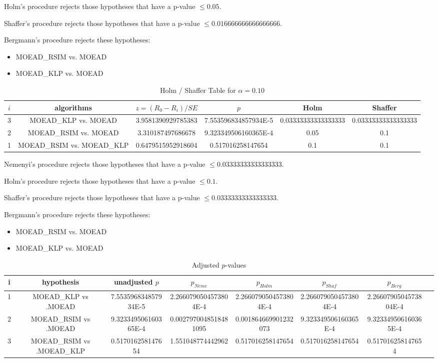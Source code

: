 \documentclass[a4paper,10pt]{article}
\begin{document}
\begin{landscape}
Holm's procedure rejects those hypotheses that have a p-value $\le0.05$.


Shaffer's procedure rejects those hypotheses that have a p-value $\le0.016666666666666666$.


Bergmann's procedure rejects these hypotheses:


\begin{itemize}


\item MOEAD_RSIM vs. MOEAD
\item MOEAD_KLP vs. MOEAD
\end{itemize}


\begin{table}[!htp]
\centering\tiny
\caption{Holm / Shaffer Table for $\alpha=0.10$}
\begin{tabular}{cccccc}
$i$&algorithms&$z=(R_0 - R_i)/SE$&$p$&Holm&Shaffer\\
\hline
3&MOEAD_KLP vs. MOEAD&3.9581390929785383&7.553596834857934E-5&0.03333333333333333&0.03333333333333333\\
2&MOEAD_RSIM vs. MOEAD&3.310187497686678&9.323349506160365E-4&0.05&0.1\\
1&MOEAD_RSIM vs. MOEAD_KLP&0.6479515952918604&0.517016258147654&0.1&0.1\\
\hline
\end{tabular}
\end{table}
Nemenyi's procedure rejects those hypotheses that have a p-value $\le0.03333333333333333$.


Holm's procedure rejects those hypotheses that have a p-value $\le0.1$.


Shaffer's procedure rejects those hypotheses that have a p-value $\le0.03333333333333333$.


Bergmann's procedure rejects these hypotheses:


\begin{itemize}


\item MOEAD_RSIM vs. MOEAD
\item MOEAD_KLP vs. MOEAD
\end{itemize}


\begin{table}[!htp]
\centering\tiny
\caption{Adjusted $p$-values}
\begin{tabular}{cccccccc}
i&hypothesis&unadjusted $p$&$p_{Neme}$&$p_{Holm}$&$p_{Shaf}$&$p_{Berg}$\\
\hline
1&MOEAD_KLP vs .MOEAD&7.553596834857934E-5&2.2660790504573804E-4&2.2660790504573804E-4&2.2660790504573804E-4&2.2660790504573804E-4\\
2&MOEAD_RSIM vs .MOEAD&9.323349506160365E-4&0.0027970048518481095&0.001864669901232073&9.323349506160365E-4&9.323349506160365E-4\\
3&MOEAD_RSIM vs .MOEAD_KLP&0.517016258147654&1.551048774442962&0.517016258147654&0.517016258147654&0.517016258147654\\
\hline
\end{tabular}
\end{table}

\end{landscape}
\end{document}

